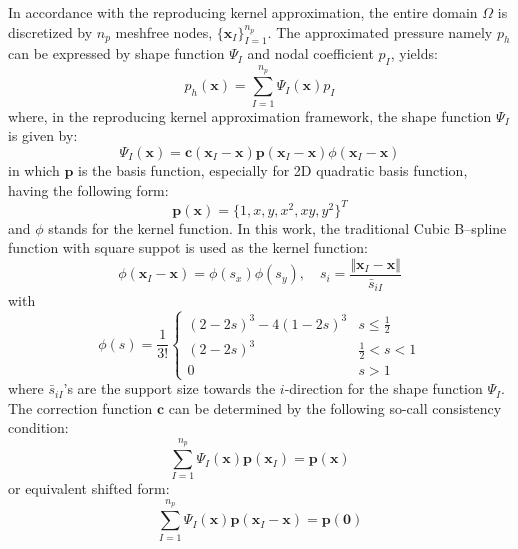 In accordance with the reproducing kernel approximation, the entire domain $\Omega$ is discretized by $n_p$ meshfree nodes, $\{\boldsymbol x_I\}_{I=1}^{n_p}$. The approximated pressure namely $p_h$ can be expressed by shape function $\Psi_I$ and nodal coefficient $p_I$, yields:
\begin{equation}
p_h(\boldsymbol x) = \sum_{I=1}^{n_p} \Psi_I(\boldsymbol x) p_I
\end{equation}
where, in the reproducing kernel approximation framework, the shape function $\Psi_I$ is given by:
\begin{equation}\label{rkshape}
\Psi_I(\boldsymbol x) = \boldsymbol c(\boldsymbol x_I-\boldsymbol x) \boldsymbol p(\boldsymbol x_I-\boldsymbol x) \phi(\boldsymbol x_I - \boldsymbol x)
\end{equation}
in which $\boldsymbol p$ is the basis function, especially for 2D quadratic basis function, having the following form: 
\begin{equation}
\boldsymbol p(\boldsymbol x) = \{ 1, x, y, x^2, xy, y^2\}^T
\end{equation}
and $\phi$ stands for the kernel function. In this work, the traditional Cubic B--spline function with square suppot is used as the kernel function:
\begin{equation}
\phi(\boldsymbol x_I-\boldsymbol x) = \phi(s_x) \phi(s_y), \quad s_i = \frac{\Vert \boldsymbol x_I - \boldsymbol x\Vert}{\bar s_{iI}}
\end{equation}
with
\begin{equation}
\phi(s) =\frac{1}{3!} \begin{cases}
    (2-2s)^3 - 4(1-2s)^3 & s\le\frac{1}{2} \\
    (2-2s)^3 &\frac{1}{2}<s<1 \\
    0 & s> 1
\end{cases}
\end{equation}
where $\bar s_{iI}$'s are the support size towards the $i$-direction for the shape function $\Psi_I$.
The correction function $\boldsymbol c$ can be determined by the following so-call consistency condition:
\begin{equation}\label{cc1}
\sum_{I=1}^{n_p}\Psi_I(\boldsymbol x) \boldsymbol p(\boldsymbol x_I) = \boldsymbol p (\boldsymbol x)
\end{equation}
or equivalent shifted form:
\begin{equation}\label{cc2}
\sum_{I=1}^{n_p}\Psi_I(\boldsymbol x) \boldsymbol p(\boldsymbol x_I-\boldsymbol x) = \boldsymbol p (\boldsymbol 0)
\end{equation}
